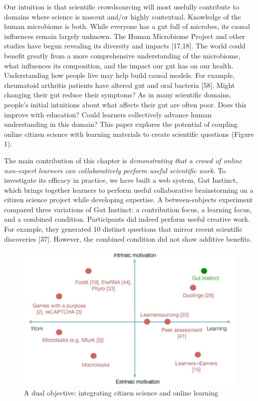 Our intuition is that scientific crowdsourcing will most usefully contribute to domains where science is nascent and/or highly contextual. Knowledge of the human microbiome is both. While everyone has a gut full of microbes, its causal influences remain largely unknown. The Human Microbiome Project and other studies have begun revealing its diversity and impacts [17,18]. The world could benefit greatly from a more comprehensive understanding of the microbiome, what influences its composition, and the impact our gut has on our health. Understanding how people live may help build causal models. For example, rheumatoid arthritis patients have altered gut and oral bacteria [58]. Might changing their gut reduce their symptoms? As in many scientific domains, people’s initial intuitions about what affects their gut are often poor. Does this improve with education? Could learners collectively advance human understanding in this domain? This paper explores the potential of coupling online citizen science with learning materials to create scientific questions (Figure 1). 

The main contribution of this chapter is \textit {demonstrating that a crowd of online non-expert learners can collaboratively perform useful scientific work}. To investigate its efficacy in practice, we have built a web system, Gut Instinct, which brings together learners to perform useful collaborative brainstorming on a citizen science project while developing expertise. A between-subjects experiment compared three variations of Gut Instinct: a contribution focus, a learning focus, and a combined condition. Participants did indeed perform useful creative work. For example, they generated 10 distinct questions that mirror recent scientific discoveries [37]. However, the combined condition did not show additive benefits. 

\begin{figure}[h] 
  \centering
  \includegraphics[width=1.0\textwidth]{figures/gutinstinct/gi-2.png}
  \caption[]
{A dual objective: integrating citizen science and online learning}
  \label{fig:gi-2}
\end{figure}


